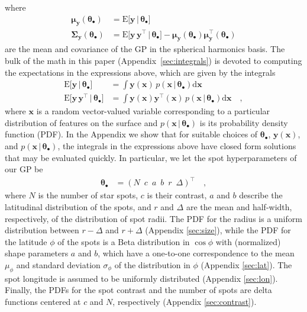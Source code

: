 \documentclass[modern]{aastex62}
\begin{document}
%
where
%
\begin{align}
    \label{eq:mean_y}
    \pmb{\mu}_{\mathbf{y}}(\pmb{\theta}_\bullet)
     & = \mathrm{E} \Big[ \mathbf{y} \, \Big| \, \pmb{\theta}_\bullet \Big]
    \\
    \label{eq:cov_y}
    \pmb{\Sigma}_{\mathbf{y}}(\pmb{\theta}_\bullet)
     & = \mathrm{E} \Big[ \mathbf{y} \, \mathbf{y}^\top \, \Big| \, \pmb{\theta}_\bullet \Big] - \pmb{\mu}_{\mathbf{y}}(\pmb{\theta}_\bullet) \pmb{\mu}_{\mathbf{y}}^\top(\pmb{\theta}_\bullet)
\end{align}
%
are the mean and covariance of the GP in the spherical harmonics basis.
The bulk of the math in this paper (Appendix~\ref{sec:integrals})
is devoted to computing
the expectations in the expressions above, which
are given by the integrals
%
\begin{align}
    \label{eq:exp_y}
    \mathrm{E} \Big[ \mathbf{y} \, \Big| \, \pmb{\theta}_\bullet \Big]
     & =
    \int \mathbf{y}(\mathbf{x} ) \, p(\mathbf{x} \, \big| \, \pmb{\theta}_\bullet)\mathrm{d}\mathbf{x}
    \\
    \label{eq:exp_yy}
    \mathrm{E} \Big[ \mathbf{y} \, \mathbf{y}^\top \, \Big| \, \pmb{\theta}_\bullet \Big]
     & =
    \int \mathbf{y}(\mathbf{x} ) \mathbf{y}^\top(\mathbf{x} ) \, p(\mathbf{x} \, \big| \, \pmb{\theta}_\bullet)\mathrm{d}\mathbf{x}
    \quad,
\end{align}
%
where $\mathbf{x}$ is a random vector-valued variable corresponding to a particular
distribution of features on the surface
and $p(\mathbf{x} \, \big| \, \pmb{\theta}_\bullet)$ is its probability density
function (PDF).
%
In the Appendix we show that for suitable choices of $\pmb{\theta}_\bullet$,
$\mathbf{y}(\mathbf{x})$,
and $p(\mathbf{x} \, \big| \, \pmb{\theta}_\bullet)$, the integrals in the expressions
above have closed form solutions that may be evaluated quickly.
%
In particular, we let the spot hyperparameters of our GP be
%
\begin{align}
    \pmb{\theta}_\bullet
     & =
    \left(
    N
    \,\,\,
    c
    \,\,\,
    a
    \,\,\,
    b
    \,\,\,
    r
    \,\,\,
    \Delta
    \right)^\top
    \quad,
\end{align}
%
where $N$ is the number of star spots, $c$ is their contrast,
$a$ and $b$ describe the latitudinal
distribution of the spots, and $r$ and $\Delta$ are the mean and
half-width, respectively, of the distribution of spot radii.
%
The PDF for the radius is a uniform distribution
between $r - \Delta$ and $r + \Delta$ (Appendix \ref{sec:size}),
while
the PDF for the latitude $\phi$ of the spots is a Beta distribution in
$\cos\phi$ with (normalized) shape parameters $a$ and $b$,
which have a one-to-one correspondence to the mean $\mu_\phi$ and
standard deviation $\sigma_\phi$ of the distribution in $\phi$
(Appendix \ref{sec:lat}).
The spot longitude is assumed to be uniformly distributed
(Appendix \ref{sec:lon}). Finally,
the PDFs for the spot contrast and the number of spots are delta functions
centered at $c$ and $N$, respectively (Appendix \ref{sec:contrast}).
\end{document}
